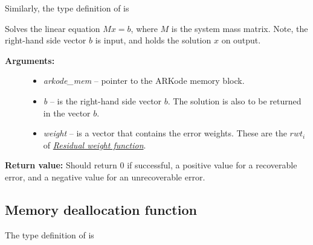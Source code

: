 \documentclass[letterpaper,10pt,english]{sphinxmanual}
\begin{document}
Similarly, the type definition of {\hyperref[linear_solvers/custom:msolve]{}} is

\begin{fulllineitems}
\label{linear_solvers/custom:msolve}
Solves the linear equation $M x = b$, where $M$ is the
system mass matrix.  Note, the right-hand side vector $b$ is
input, and holds the solution $x$ on output.
\begin{description}
\item[{\textbf{Arguments:}}] \leavevmode\begin{itemize}
\item {} 
\emph{arkode\_mem} -- pointer to the ARKode memory block.

\item {} 
\emph{b} -- is the right-hand side vector $b$. The solution
is also to be returned in the vector $b$.

\item {} 
\emph{weight} -- is a vector that contains the error weights. These
are the $rwt_i$ of {\hyperref[c_interface/User_supplied:cinterface-residualweight]{\emph{Residual weight function}}}.

\end{itemize}

\end{description}

\textbf{Return value:}  Should return 0 if successful, a positive value
for a recoverable error, and a negative value for an unrecoverable
error.

\end{fulllineitems}



\subsection{Memory deallocation function}
\label{linear_solvers/custom:memory-deallocation-function}
The type definition of {\hyperref[linear_solvers/custom:lfree]{}} is
\end{document}
